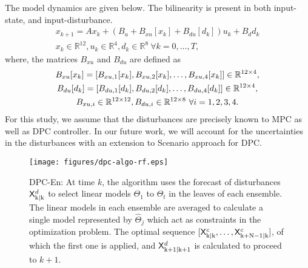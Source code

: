 The model dynamics are given below. The bilinearity is present in both input-state, and input-disturbance.
\begin{gather}
\label{E:bilinear1}
x_{k+1} = Ax_{k}+(B_u +B_{xu}[x_k] + B_{du}[d_k]) u_k+B_dd_k \\
x_{k} \in \mathbb{R}^{12}, u_{k} \in \mathbb{R}^{4}, d_{k} \in \mathbb{R}^{8} \ \forall k = 0,\dots,T, \nonumber
\end{gather}
where, the matrices $B_{xu}$ and $B_{du}$ are defined as
\begin{gather}
\label{E:bilinear2}
B_{xu}[x_k] = [ B_{xu,1}[x_k],B_{xu,2}[x_k], \dots, B_{xu,4}[x_k] ] \in \mathbb{R}^{12\times4}, \nonumber\\
B_{du}[d_k] = [ B_{du,1}[d_k],B_{du,2}[d_k], \dots, B_{du,4}[d_k] ] \in \mathbb{R}^{12\times4}\nonumber, \\
B_{xu,i} \in \mathbb{R}^{12\times12}, B_{du,i} \in \mathbb{R}^{12\times8} \ \forall i=1,2,3,4.\nonumber
\end{gather}
For this study, we assume that the disturbances are precisely known to MPC as well as DPC controller. In our future work, we will account for the uncertainties in the disturbances with an extension to Scenario approach \cite{Bernardini2009} for DPC.

\begin{figure}[t!]
	\centering
	\texttt{[image: figures/dpc-algo-rf.eps]}
	\caption{DPC-En: At time $k$, the algorithm uses the forecast of disturbances $\mathsf{X}^d_{\mathrm{k|k}}$ to select linear models $\Theta_1$ to $\Theta_t$ in the leaves of each ensemble. The linear models in each ensemble are averaged to calculate a single model represented by $\hat{\Theta}_j$ which act as constraints in the optimization problem. The optimal sequence $[\mathsf{X}^c_{\mathrm{k|k}},\dots,\mathsf{X}^c_{\mathrm{k+N-1|k}}]$, of which the first one is applied, and $\mathsf{X}^d_{\mathrm{k+1|k+1}}$ is calculated to proceed to $k+1$.}
	\label{F:dpc-algo-rf}
\end{figure}